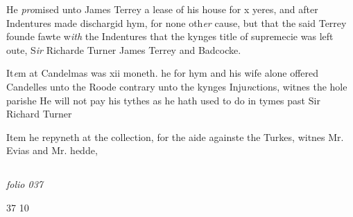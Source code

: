\documentclass[12pt, a4paper]{book}
\begin{document}
            	
            	
            		
			
            		
		\ifthenelse{\isodd{\thepage}}
		{\reversemarginpar}
		{\normalmarginpar}
		He \textit{pro}mised unto James Terrey a lease of his house for x
            			yeres, and after Indentures made dischargid hym, for none oth\textit{er}
            			cause, but that the said Terrey founde fawte w\textit{ith} the Indentures
            			that the kynges title of supremecie was left oute, S\textit{ir} Richarde Turner
            			James Terrey and Badcocke.
            	
            	
            		
				\marginpar[\vspace{0.5cm}{\textcolor{Gray}{offerynge of candelles}}]{}
			
            		
		\ifthenelse{\isodd{\thepage}}
		{\reversemarginpar}
		{\normalmarginpar}
		It\textit{e}m at Candelmas was xii moneth. he for hym and his wife
            			alone offered Candelles unto the Roode contrary unto the
            			kynges Inju\textit{n}ctions, witnes the hole parishe
            			He will not pay his tythes as he hath used to do in tymes
            			past Sir Richard Turner
            		
		\ifthenelse{\isodd{\thepage}}
		{\reversemarginpar}
		{\normalmarginpar}
		Item he repyneth at the collection, for the aide againste
            			the Turkes, witnes Mr. Evias and Mr. hedde,
            	




            
\dotfill
					  \subsection*{}  \subsection*{}

\textit{folio 037}


\begin{flushright}{\color{Mahogany}37} 10\end{flushright}
 
\end{document}
